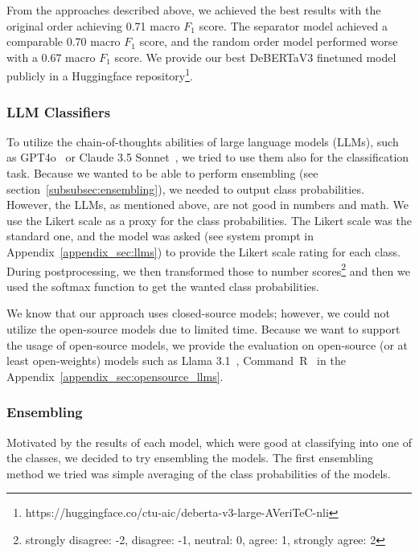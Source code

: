 From the approaches described above, we achieved the best results with the original order achieving 0.71 macro $F_1$ score. The separator model achieved a comparable 0.70 macro $F_1$ score, and the random order model performed worse with a 0.67 macro $F_1$ score. We provide our best DeBERTaV3 finetuned model publicly in a Huggingface repository\footnote{https://huggingface.co/ctu-aic/deberta-v3-large-AVeriTeC-nli}.

\subsubsection*{LLM Classifiers}
To utilize the chain-of-thoughts abilities of large language models (LLMs), such as GPT4o~\cite{openai2024gpt4o} or Claude 3.5 Sonnet~\cite{anthropic2024claude35sonnet}, we tried to use them also for the classification task. Because we wanted to be able to perform ensembling (see section~\ref{subsubsec:ensembling}), we needed to output class probabilities. However, the LLMs, as mentioned above, are not good in numbers and math. We use the Likert scale as a proxy for the class probabilities. The Likert scale was the standard one, and the model was asked (see system prompt in Appendix~\ref{appendix_sec:llms}) to provide the Likert scale rating for each class. During postprocessing, we then transformed those to number scores\footnote{strongly disagree: -2, disagree: -1, neutral: 0, agree: 1, strongly agree: 2} and then we used the softmax function to get the wanted class probabilities.

We know that our approach uses closed-source models; however, we could not utilize the open-source models due to limited time. Because we want to support the usage of open-source models, we provide the evaluation on open-source (or at least open-weights) models such as Llama 3.1~\cite{meta2024llama31}, Command~R~\cite{cohere2024commandr} in the Appendix~\ref{appendix_sec:opensource_llms}.

\subsubsection*{Ensembling}
\label{subsubsec:ensembling}

Motivated by the results of each model, which were good at classifying into one of the classes, we decided to try ensembling the models. The first ensembling method we tried was simple averaging of the class probabilities of the models.

